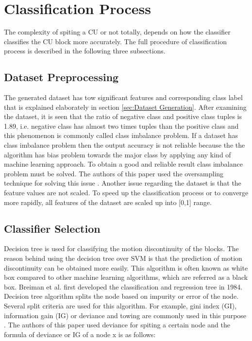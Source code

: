 \documentclass{article}
\begin{document}
\section{Classification Process}
\label{sec:Classification Process}

The complexity of spiting a CU or not totally, depends on how the classifier classifies the CU block more accurately. The full procedure of classification process is described in the following three subsections.

\subsection{Dataset Preprocessing}
\label{subsec:Dataset Preprocessingr}

The generated dataset has tow significant features and corresponding class label that is explained elaborately in section \ref{sec:Dataset Generation}. After examining the dataset, it is seen that the ratio of negative class and positive class tuples is 1.89, i.e. negative class has almost two times tuples than the positive class and this phenomenon is commonly called class imbalance problem. If a dataset has class imbalance problem then the output accuracy is not reliable because the the algorithm has bias problem towards the major class by applying any kind of machine learning approach. To obtain a good and reliable result class imbalance problem must be solved. The authors of  this paper used the oversampling technique for solving this issue \cite{han2011data}. Another issue regarding the dataset is that the feature values are not scaled. To speed up the classification process or to converge more rapidly, all features of the dataset are scaled up into [0,1] range.


\subsection{Classifier Selection}
\label{subsec:Decision Tree Classifier}

Decision tree is used for classifying the motion discontinuity of the blocks. The reason behind using the decision tree over SVM is that the prediction of motion discontinuity can be obtained more easily. This algorithm is often known as white box compared to other machine learning algorithms, which are referred as a black box. Breiman et al. \cite{breiman1984classification} first developed the classification and regression tree in 1984. Decision tree algorithm splits the node based on impurity or error of the node. Several split criteria are used for this algorithm. For example, gini index (GI), information gain (IG) or deviance and towing are commonly used in this purpose \cite{han2011data}. The authors of this paper used deviance for spiting a certain node and the formula of deviance or IG of a node x is as follows:  
\end{document}
